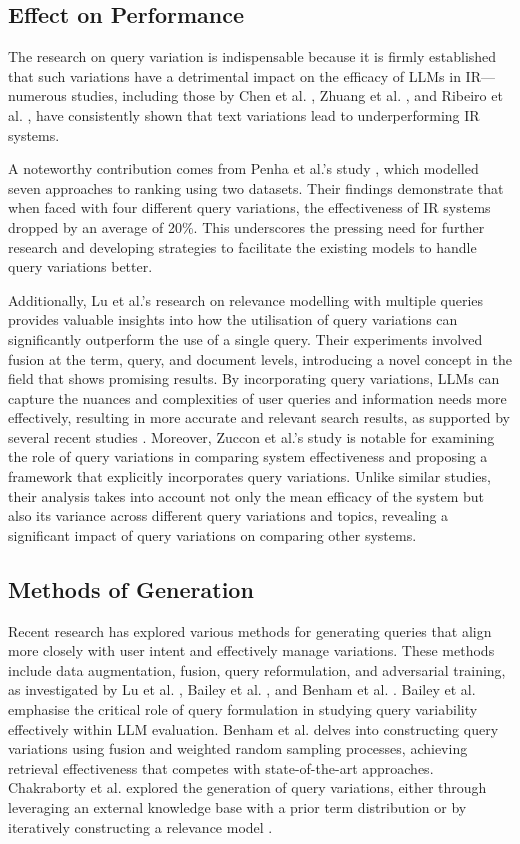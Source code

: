 \subsection{Effect on Performance}
The research on query variation is indispensable because it is firmly established that such variations have a detrimental impact on the efficacy of LLMs in IR—numerous studies, including those by Chen et al. \cite{chen}, Zhuang et al. \cite{characterbert}, and Ribeiro et al. \cite{ribeiro}, have consistently shown that text variations lead to underperforming IR systems.

A noteworthy contribution comes from Penha et al.'s study \cite{penha2022}, which modelled seven approaches to ranking using two datasets. Their findings demonstrate that when faced with four different query variations, the effectiveness of IR systems dropped by an average of 20\%. This underscores the pressing need for further research and developing strategies to facilitate the existing models to handle query variations better.

Additionally, Lu et al.'s research \cite{lu} on relevance modelling with multiple queries provides valuable insights into how the utilisation of query variations can significantly outperform the use of a single query. Their experiments involved fusion at the term, query, and document levels, introducing a novel concept in the field that shows promising results. By incorporating query variations, LLMs can capture the nuances and complexities of user queries and information needs more effectively, resulting in more accurate and relevant search results, as supported by several recent studies \cite{penha2022, zendel, lu, characterbert}. Moreover, Zuccon et al.'s study \cite{zuccon} is notable for examining the role of query variations in comparing system effectiveness and proposing a framework that explicitly incorporates query variations. Unlike similar studies, their analysis takes into account not only the mean efficacy of the system but also its variance across different query variations and topics, revealing a significant impact of query variations on comparing other systems.

\subsection{Methods of Generation}
Recent research has explored various methods for generating queries that align more closely with user intent and effectively manage variations. These methods include data augmentation, fusion, query reformulation, and adversarial training, as investigated by Lu et al. \cite{lu}, Bailey et al. \cite{bailey}, and Benham et al. \cite{benham}. Bailey et al. emphasise the critical role of query formulation in studying query variability effectively within LLM evaluation. Benham et al. delves into constructing query variations using fusion and weighted random sampling processes, achieving retrieval effectiveness that competes with state-of-the-art approaches. Chakraborty et al. explored the generation of query variations, either through leveraging an external knowledge base with a prior term distribution or by iteratively constructing a relevance model \cite{chakraborty}.

